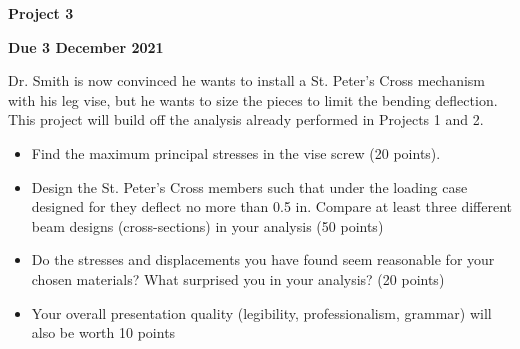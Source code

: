 \documentclass[12pt, oneside]{article}
\begin{document}
\begin{center}
\textbf{\Large Project 3}

\textbf{Due 3 December 2021}
\end{center}

Dr. Smith is now convinced he wants to install a St. Peter's Cross mechanism with his leg vise, but he wants to size the pieces to limit the bending deflection.
This project will build off the analysis already performed in Projects 1 and 2.
\begin{itemize}
  \item Find the maximum principal stresses in the vise screw (20 points).
	\item Design the St. Peter's Cross members such that under the loading case designed for they deflect no more than 0.5 in.
		Compare at least three different beam designs (cross-sections) in your analysis (50 points)
	\item Do the stresses and displacements you have found seem reasonable for your chosen materials? What surprised you in your analysis? (20 points)
	\item Your overall presentation quality (legibility, professionalism, grammar) will also be worth 10 points
\end{itemize}
\end{document}
